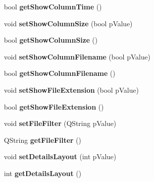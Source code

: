 \begin{DoxyCompactItemize}
\item 
\hypertarget{classQEScript_a5ae9e90ddb91fafe266414156a58bc44}{
bool {\bfseries getShowColumnTime} ()}
\label{classQEScript_a5ae9e90ddb91fafe266414156a58bc44}

\item 
\hypertarget{classQEScript_a55c1ffe95e585ba42146c06cee40a30a}{
void {\bfseries setShowColumnSize} (bool pValue)}
\label{classQEScript_a55c1ffe95e585ba42146c06cee40a30a}

\item 
\hypertarget{classQEScript_a8eb4ce9236eeae5e05674446732aea9e}{
bool {\bfseries getShowColumnSize} ()}
\label{classQEScript_a8eb4ce9236eeae5e05674446732aea9e}

\item 
\hypertarget{classQEScript_a4ff9a68bc5ee9bf0def94186e3b39d5a}{
void {\bfseries setShowColumnFilename} (bool pValue)}
\label{classQEScript_a4ff9a68bc5ee9bf0def94186e3b39d5a}

\item 
\hypertarget{classQEScript_ae981081207554fe70b35956d7ecc4c69}{
bool {\bfseries getShowColumnFilename} ()}
\label{classQEScript_ae981081207554fe70b35956d7ecc4c69}

\item 
\hypertarget{classQEScript_a1a99d3c1876aff8c84091bfb337ac2cf}{
void {\bfseries setShowFileExtension} (bool pValue)}
\label{classQEScript_a1a99d3c1876aff8c84091bfb337ac2cf}

\item 
\hypertarget{classQEScript_aad235c15a7baadd280813c92f4f92769}{
bool {\bfseries getShowFileExtension} ()}
\label{classQEScript_aad235c15a7baadd280813c92f4f92769}

\item 
\hypertarget{classQEScript_a3e3b77e990f9cb6a80fb39f2ab368ee9}{
void {\bfseries setFileFilter} (QString pValue)}
\label{classQEScript_a3e3b77e990f9cb6a80fb39f2ab368ee9}

\item 
\hypertarget{classQEScript_a728a7d1b47ff0c1eccaee9b004d3482b}{
QString {\bfseries getFileFilter} ()}
\label{classQEScript_a728a7d1b47ff0c1eccaee9b004d3482b}

\item 
\hypertarget{classQEScript_acf8b7b7ead5a8f2d3ca14cedd5a58e98}{
void {\bfseries setDetailsLayout} (int pValue)}
\label{classQEScript_acf8b7b7ead5a8f2d3ca14cedd5a58e98}

\item 
\hypertarget{classQEScript_adda955c6b3657d6063237f5cb3bc4efb}{
int {\bfseries getDetailsLayout} ()}
\label{classQEScript_adda955c6b3657d6063237f5cb3bc4efb}


\end{DoxyCompactItemize}
